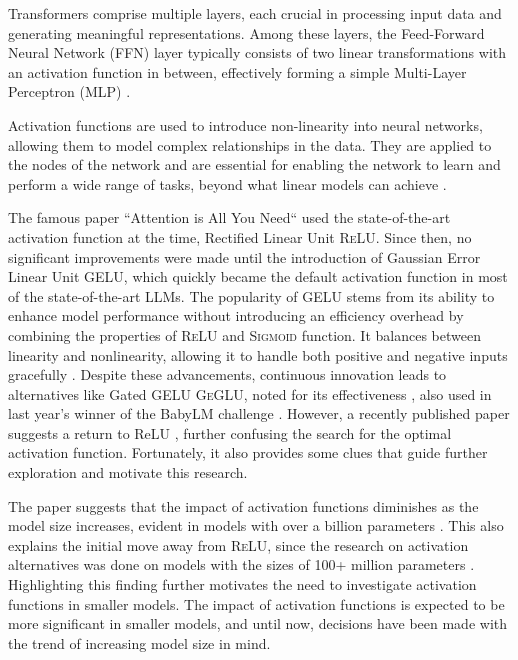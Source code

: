 Transformers comprise multiple layers, each crucial in processing input data and generating meaningful representations. Among these layers, the Feed-Forward Neural Network (FFN) layer typically consists of two linear transformations with an activation function in between, effectively forming a simple Multi-Layer Perceptron (MLP) \cite{geva_transformer_2022}.

Activation functions are used to introduce non-linearity into neural networks, allowing them to model complex relationships in the data. They are applied to the nodes of the network and are essential for enabling the network to learn and perform a wide range of tasks, beyond what linear models can achieve \cite{dubey2022activation}.

The famous paper ``Attention is All You Need“ \cite{Vaswani2017} used the state-of-the-art activation function at the time, Rectified Linear Unit \textsc{ReLU}. Since then, no significant improvements were made until the introduction of Gaussian Error Linear Unit \textsc{GELU}, which quickly became the default activation function in most of the state-of-the-art LLMs. The popularity of GELU stems from its ability to enhance model performance without introducing an efficiency overhead by combining the properties of \textsc{ReLU} and \textsc{Sigmoid} function. It balances between linearity and nonlinearity, allowing it to handle both positive and negative inputs gracefully \cite{Hendrycks2023}. Despite these advancements, continuous innovation leads to alternatives like Gated GELU \textsc{GeGLU}, noted for its effectiveness \cite{Shazeer2020}, also used in last year's winner of the BabyLM challenge \cite{Samuel2023}. However, a recently published paper suggests a return to ReLU \cite{Mirzadeh2023}, further confusing the search for the optimal activation function. Fortunately, it also provides some clues that guide further exploration and motivate this research.

The paper suggests that the impact of activation functions diminishes as the model size increases, evident in models with over a billion parameters \cite{Mirzadeh2023}. This also explains the initial move away from \textsc{ReLU}, since the research on activation alternatives was done on models with the sizes of 100+ million parameters \cite{Shazeer2020} \cite{Hendrycks2023}. Highlighting this finding further motivates the need to investigate activation functions in smaller models. The impact of activation functions is expected to be more significant in smaller models, and until now, decisions have been made with the trend of increasing model size in mind.


